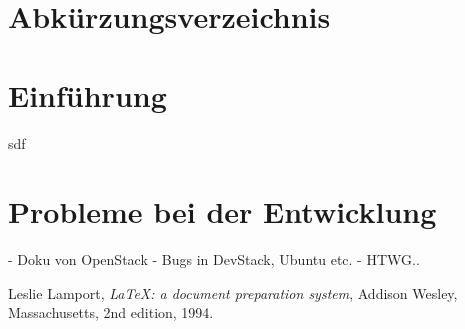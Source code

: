 \documentclass[11pt,a4paper,bibtotocnumbered]{scrreprt}
\begin{document}
\begin{singlespace}

\setcounter{page}{1}
\end{singlespace}

\tableofcontents
\listoffigures
\listoftables

\chapter*{Abkürzungsverzeichnis} 

\begin{acronym}[LAENGE]
\end{acronym}

\cleardoublepage




\chapter{Einführung} 

sdf

\chapter{Probleme bei der Entwicklung} 

- Doku von OpenStack
- Bugs in DevStack, Ubuntu etc.
- HTWG..
 







\begin{singlespace}
\begin{thebibliography}{9}

  Leslie Lamport,
  \emph{\LaTeX: a document preparation system},
  Addison Wesley, Massachusetts,
  2nd edition,
  1994.

\end{thebibliography}
\end{singlespace}
\end{document}
